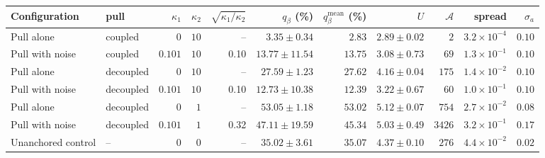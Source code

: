 \setlength{\tabcolsep}{3.5pt}\begin{tabular}{llrrrrrrrrr}
\toprule
Configuration & pull & $\kappa_1$ & $\kappa_2$ & $\sqrt{\kappa_1/\kappa_2}$ & $q_\beta$ (\%) & $q_\beta^{\mathrm{mean}}$ (\%) & $U$ & $\mathcal A$ & spread & $\sigma_a$ \\
\midrule
Pull alone & coupled & $0$ & $10$ & -- & $3.35\pm0.34$ & $2.83$ & $2.89\pm0.02$ & $2$ & $3.2\times10^{-4}$ & $0.10$ \\
Pull with noise & coupled & $0.101$ & $10$ & 0.10 & $13.77\pm11.54$ & $13.75$ & $3.08\pm0.73$ & $69$ & $1.3\times10^{-1}$ & $0.10$ \\
Pull alone & decoupled & $0$ & $10$ & -- & $27.59\pm1.23$ & $27.62$ & $4.16\pm0.04$ & $175$ & $1.4\times10^{-2}$ & $0.10$ \\
Pull with noise & decoupled & $0.101$ & $10$ & 0.10 & $12.73\pm10.38$ & $12.39$ & $3.22\pm0.67$ & $60$ & $1.0\times10^{-1}$ & $0.10$ \\
Pull alone & decoupled & $0$ & $1$ & -- & $53.05\pm1.18$ & $53.02$ & $5.12\pm0.07$ & $754$ & $2.7\times10^{-2}$ & $0.08$ \\
Pull with noise & decoupled & $0.101$ & $1$ & 0.32 & $47.11\pm19.59$ & $45.34$ & $5.03\pm0.49$ & $3426$ & $3.2\times10^{-1}$ & $0.17$ \\
Unanchored control & -- & $0$ & $0$ & -- & $35.02\pm3.61$ & $35.07$ & $4.37\pm0.10$ & $276$ & $4.4\times10^{-2}$ & $0.02$ \\
\bottomrule
\end{tabular}
